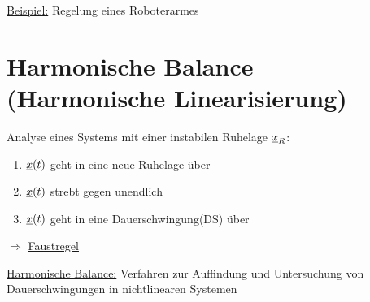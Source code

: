 \documentclass[openany,a4paper,11pt]{book}
\begin{document}
\uline{Beispiel:} Regelung eines Roboterarmes  
\chapter[Harmonische Balance]{Harmonische Balance (Harmonische Linearisierung)}
Analyse eines Systems mit einer instabilen Ruhelage $\uline{x}_R$: \begin{enumerate}
    \item $\uline{x}(t)$ geht in eine neue Ruhelage über
    \item $\uline{x}(t)$ strebt gegen unendlich
    \item $\uline{x}(t)$ geht in eine Dauerschwingung(DS) über
\end{enumerate}
$\Rightarrow$ \uline{Faustregel}\\
\begin{minipage}[c]{\textwidth}
\end{minipage}
\uline{Harmonische Balance:} Verfahren zur Auffindung und Untersuchung von Dauerschwingungen in nichtlinearen Systemen
\end{document}
